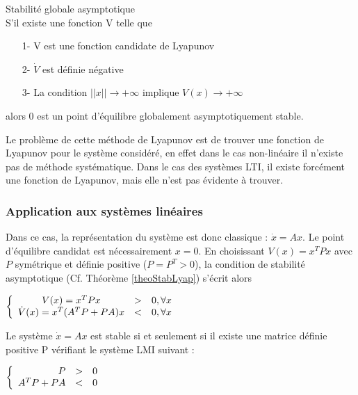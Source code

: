 \begin{theo} Stabilité globale asymptotique\\
	\label{theoStabLyap}
S'il existe une fonction V telle que
\begin{itemize}
\item[1-] V est une fonction candidate de Lyapunov
\item[2-] $\dot{V}$ est définie négative
\item[3-] La condition $||x|| \rightarrow +\infty$ implique $V(x) \rightarrow +\infty$
\end{itemize}
alors 0 est un point d'équilibre globalement asymptotiquement stable.
\end{theo}

Le problème de cette méthode de Lyapunov est de trouver une fonction de Lyapunov pour le système considéré, en effet dans le cas non-linéaire il n'existe pas de méthode systématique. Dans le cas des systèmes LTI, il existe forcément une fonction de Lyapunov, mais elle n'est pas évidente à trouver.

\subsubsection{Application aux systèmes linéaires}
Dans ce cas, la représentation du système est donc classique : $\dot{x} = Ax$. Le point d'équilibre candidat est nécessairement $x = 0$. En choisissant $V(x) = x^TPx$ avec $P$ symétrique et définie positive ($P = P^T > 0$), la condition de stabilité asymptotique (Cf. Théorème \ref{theoStabLyap}) s'écrit alors 
\begin{center}
	$   \left \{
	\begin{array}{c c l}
	V(x) = x^TPx & > & 0, \forall x \\
	\dot{V}(x) = x^T(A^TP + PA)x & < & 0, \forall x
	\end{array}
	\right. $
\end{center}

\begin{theo}
Le système $\dot{x} = Ax$ est stable si et seulement si il existe une matrice définie positive P vérifiant le système LMI suivant : 
\begin{center}
$   \left \{
\begin{array}{r c l}
P & > & 0 \\
A^TP + PA & < & 0
\end{array}
\right. $
\end{center}
\end{theo}

